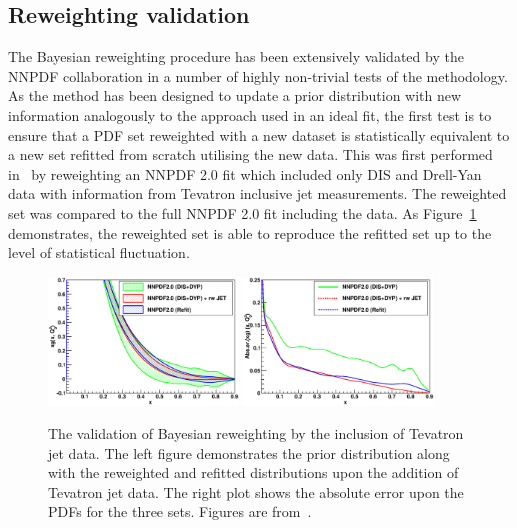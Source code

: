 \subsection{Reweighting validation}
The Bayesian reweighting procedure has been extensively validated by the NNPDF collaboration in a number of highly non-trivial tests of the methodology. As the method has been designed to update a prior distribution with new information analogously to the approach used in an ideal fit, the first test is to ensure that a PDF set reweighted with a new dataset is statistically equivalent to a new set refitted from scratch utilising the new data. This was first performed in~\cite{Ball:2010gb} by reweighting an NNPDF 2.0 fit which included only DIS and Drell-Yan data with information from Tevatron inclusive jet measurements. The reweighted set was compared to the full NNPDF 2.0 fit including the data. As Figure~\ref{fig:rwvalid} demonstrates, the reweighted set is able to reproduce the refitted set up to the level of statistical fluctuation.


\begin{figure}[ht!]
\centering
\includegraphics[width=0.45\textwidth]{4-LHCtools/figs/jets-t0-xg_Q2_2_lin.eps}
\includegraphics[width=0.45\textwidth]{4-LHCtools/figs/jets-t0-abserror-xg_Q2_2_lin.eps}
\caption[Validation of Bayesian reweighting by the inclusion of Tevatron jet data]{The validation of Bayesian reweighting by the inclusion of Tevatron jet data. The left figure demonstrates the prior distribution along with the reweighted and refitted distributions upon the addition of Tevatron jet data. The right plot shows the absolute error upon the PDFs for the three sets. Figures are from~\cite{Ball:2010gb}.}
\label{fig:rwvalid}
\end{figure}

